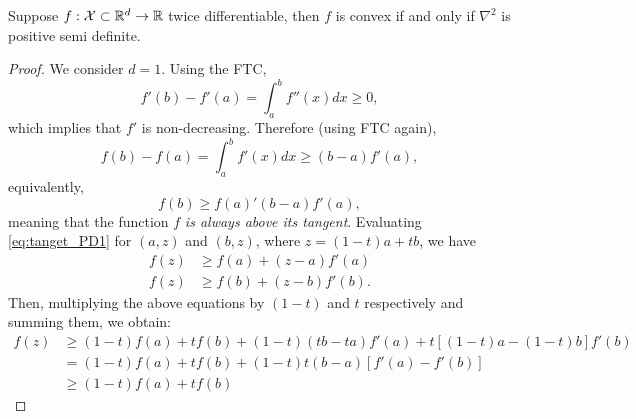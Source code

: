 \begin{theorem}
Suppose $f:{\mathcal X}\subset\mathbb{R}^d\to\mathbb{R}$ twice differentiable, then $f$ is convex if and only if $\nabla^2$ is positive semi definite.
\end{theorem}
\begin{proof}
We consider $d=1$. Using the FTC, 
\begin{equation}
	f'(b) - f'(a) = \int_a^b f''(x)dx \geq 0,
 \end{equation}
 which implies that $f'$ is non-decreasing. Therefore (using FTC again),
 \begin{equation}
 	f(b) - f(a) = \int_a^b f'(x)dx \geq (b-a)f'(a),
 \end{equation}
 equivalently, 
\begin{equation}
	f(b)\geq f(a) ' (b-a)f'(a), \label{eq:tanget_PD1}
\end{equation}
meaning that the function $f$ \emph{is always above its tangent}. Evaluating \eqref{eq:tanget_PD1} for $(a,z)$ and $(b,z)$, where $z=(1-t)a + tb$, we have
\begin{align}
	f(z) &\geq f(a) + (z-a)f'(a)\\
	f(z) &\geq f(b) + (z-b)f'(b).
\end{align}
Then, multiplying the above equations by $(1-t)$ and $t$ respectively and summing them, we obtain: 
\begin{align}
	f(z) &\geq (1-t)f(a) + tf(b) + (1-t)(tb-ta)f'(a) +t[(1-t)a - (1-t)b]f'(b)\\
	     &=    (1-t)f(a) + tf(b) + (1-t)t(b-a) [f'(a) - f'(b)]\\
	     &\geq (1-t)f(a) + tf(b)
\end{align}
\end{proof}



\begin{mdframed}[style=ejemplo, frametitle={\center Example: Explore some functions}]


\end{mdframed}









